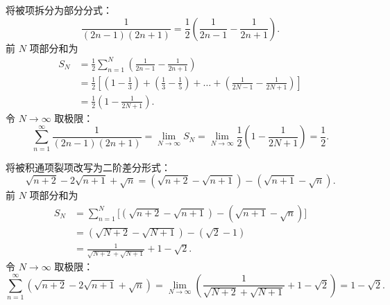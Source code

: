 \begin{myproof}

    将被项拆分为部分分式：
    \begin{equation}
        \frac{1}{(2n-1)(2n+1)} = \frac{1}{2}\left( \frac{1}{2n-1} - \frac{1}{2n+1} \right).
    \end{equation}
    前 $N$ 项部分和为
    \begin{equation}
        \begin{aligned}
            S_N & = \frac{1}{2} \sum_{n=1}^N \left( \frac{1}{2n-1} - \frac{1}{2n+1} \right)                                                                                       \\
                & = \frac{1}{2} \left[ \left( 1 - \frac{1}{3} \right) + \left( \frac{1}{3} - \frac{1}{5} \right) + \dots + \left( \frac{1}{2N-1} - \frac{1}{2N+1} \right) \right] \\
                & = \frac{1}{2}\left( 1 - \frac{1}{2N+1} \right).
        \end{aligned}
    \end{equation}
    令 $N \to \infty$ 取极限：
    \begin{equation}
        \sum_{n=1}^\infty \frac{1}{(2n-1)(2n+1)} = \lim_{N\to\infty} S_N = \lim_{N\to\infty} \frac{1}{2}\left( 1 - \frac{1}{2N+1} \right) = \frac{1}{2}.
    \end{equation}


    将被积通项裂项改写为二阶差分形式：
    \begin{equation}
        \sqrt{n+2} - 2\sqrt{n+1} + \sqrt{n} = (\sqrt{n+2} - \sqrt{n+1}) - (\sqrt{n+1} - \sqrt{n}).
    \end{equation}
    前 $N$ 项部分和为
    \begin{equation}
        \begin{aligned}
            S_N & = \sum_{n=1}^N \bigl[ (\sqrt{n+2} - \sqrt{n+1}) - (\sqrt{n+1} - \sqrt{n}) \bigr] \\
                & = (\sqrt{N+2} - \sqrt{N+1}) - (\sqrt{2} - 1)                                     \\
                & = \frac{1}{\sqrt{N+2} + \sqrt{N+1}} + 1 - \sqrt{2}.
        \end{aligned}
    \end{equation}
    令 $N \to \infty$ 取极限：
    \begin{equation}
        \sum_{n=1}^\infty (\sqrt{n+2} - 2\sqrt{n+1} + \sqrt{n}) = \lim_{N\to\infty} \left( \frac{1}{\sqrt{N+2} + \sqrt{N+1}} + 1 - \sqrt{2} \right) = 1 - \sqrt{2}.
    \end{equation}


\end{myproof}
